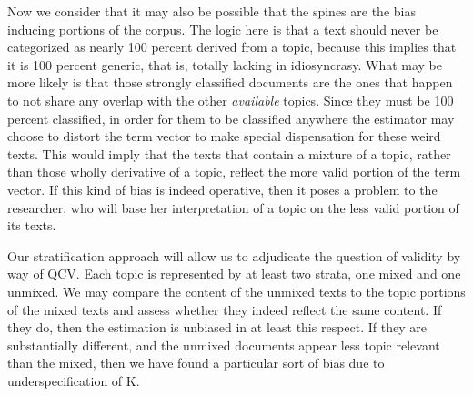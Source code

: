 \documentclass[]{book}
\theoremstyle{definition}
\theoremstyle{definition}
\theoremstyle{definition}
\theoremstyle{remark}
\begin{document}
Now we consider that it may also be possible that the spines are the
bias inducing portions of the corpus. The logic here is that a text
should never be categorized as nearly 100 percent derived from a topic,
because this implies that it is 100 percent generic, that is, totally
lacking in idiosyncrasy. What may be more likely is that those strongly
classified documents are the ones that happen to not share any overlap
with the other \emph{available} topics. Since they must be 100 percent
classified, in order for them to be classified anywhere the estimator
may choose to distort the term vector to make special dispensation for
these weird texts. This would imply that the texts that contain a
mixture of a topic, rather than those wholly derivative of a topic,
reflect the more valid portion of the term vector. If this kind of bias
is indeed operative, then it poses a problem to the researcher, who will
base her interpretation of a topic on the less valid portion of its
texts.

Our stratification approach will allow us to adjudicate the question of
validity by way of QCV. Each topic is represented by at least two
strata, one mixed and one unmixed. We may compare the content of the
unmixed texts to the topic portions of the mixed texts and assess
whether they indeed reflect the same content. If they do, then the
estimation is unbiased in at least this respect. If they are
substantially different, and the unmixed documents appear less topic
relevant than the mixed, then we have found a particular sort of bias
due to underspecification of K.
\end{document}
